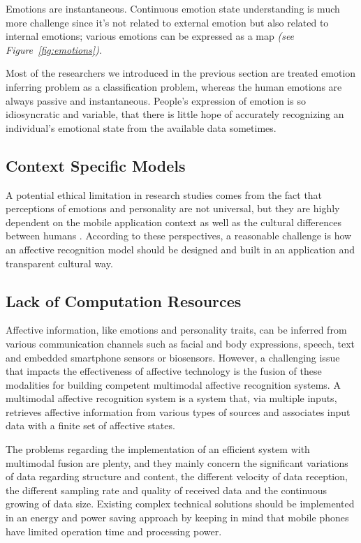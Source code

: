 Emotions are instantaneous. Continuous emotion state understanding is much more challenge since it's not related to external emotion but also related to internal emotions; various emotions can be expressed as a map \textit{(see Figure~\ref{fig:emotions})}.

Most of the researchers we introduced in the previous section are treated emotion inferring problem as a classification problem, whereas the human emotions are always passive and instantaneous. People's expression of emotion is so idiosyncratic and variable, that there is little hope of accurately recognizing an individual’s emotional state from the available data sometimes. 

\subsection{Context Specific Models}

A potential ethical limitation in research studies comes from the fact that perceptions of emotions and personality are not universal, but they are highly dependent on the mobile application context \cite{Gao2012, Shah2015, bhattacharya2017predictive, Tikadar2017} as well as the cultural differences between humans \cite{mesquita1992cultural, masuda2008placing, gendron2014perceptions}. According to these perspectives, a reasonable challenge is how an affective recognition model should be designed and built in an application and transparent cultural way.

\subsection{Lack of Computation Resources}

Affective information, like emotions and personality traits, can be inferred from various communication channels such as facial and body expressions, speech, text and embedded smartphone sensors or biosensors. 
However, a challenging issue that impacts the effectiveness of affective technology is the fusion of these modalities for building competent multimodal affective recognition systems. 
A multimodal affective recognition system is a system that, via multiple inputs, retrieves affective information from various types of sources and associates input data with a finite set of affective states\cite{ganti2011mobile}.

The problems regarding the implementation of an efficient system with multimodal fusion are plenty, and they mainly concern the significant variations of data regarding structure and content, the different velocity of data reception, the different sampling rate and quality of received data and the continuous growing of data size.
Existing complex technical solutions should be implemented in an energy and power saving approach by keeping in mind that mobile phones have limited operation time and processing power. 


